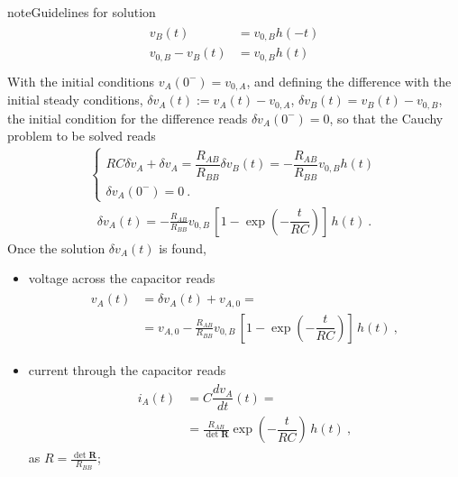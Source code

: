 \documentclass[letterpaper,10pt,italian]{jupyterBook}
\begin{document}
\begin{sphinxadmonition}{note}{Guidelines for solution}
\begin{equation*}
\begin{split}
\begin{aligned}
  v_{B}(t) & = v_{0,B} h(-t) \\
  v_{0,B} - v_{B}(t) & = v_{0,B} h(t)  \\
\end{aligned}\end{split}
\end{equation*}
\sphinxAtStartPar
With the initial conditions \(v_{A}(0^-) = v_{0,A}\), and defining the difference with the initial steady conditions, \(\delta v_A(t) := v_A(t) - v_{0,A}\), \(\delta v_B(t) = v_B(t) - v_{0,B}\), the initial condition for the difference reads \(\delta v_{A}(0^-) = 0\), so that the Cauchy problem to be solved reads
\begin{equation*}
\begin{split}\begin{cases}
  RC \delta \dot{v}_A + \delta v_{A} = \dfrac{R_{AB}}{R_{BB}} \delta v_{B}(t) = - \dfrac{R_{AB}}{R_{BB}} v_{0,B} h(t) \\
  \delta v_A(0^-) = 0 \ .
\end{cases}\end{split}
\end{equation*}\begin{equation*}
\begin{split}\delta v_A(t) = -\frac{R_{AB}}{R_{BB}} v_{0,B} \, \left[ 1 - \exp\left( - \dfrac{t}{RC} \right) \right] \, h(t) \ .\end{split}
\end{equation*}
\sphinxAtStartPar
Once the solution \(\delta v_A(t)\) is found,
\begin{itemize}
\item {} 
\sphinxAtStartPar
voltage across the capacitor reads
\begin{equation*}
\begin{split}\begin{aligned}
     v_A(t)
     & = \delta v_A(t) + v_{A,0} = \\
     & = v_{A,0} - \frac{R_{AB}}{R_{BB}} v_{0,B} \, \left[ 1 - \exp\left( - \dfrac{t}{RC} \right) \right] \, h(t) \ ,
   \end{aligned}\end{split}
\end{equation*}
\item {} 
\sphinxAtStartPar
current through the capacitor reads
\begin{equation*}
\begin{split}\begin{aligned}
     i_A(t) 
     & = C \dfrac{d v_A}{dt}(t) = \\
     & = \frac{R_{AB}}{\det \mathbf{R}} \exp\left( - \dfrac{t}{RC}  \right) \, h(t) \ ,
   \end{aligned}\end{split}
\end{equation*}
\sphinxAtStartPar
as \(R = \frac{\det \mathbf{R}}{R_{BB}}\);


\end{itemize}
\end{sphinxadmonition}
\end{document}
